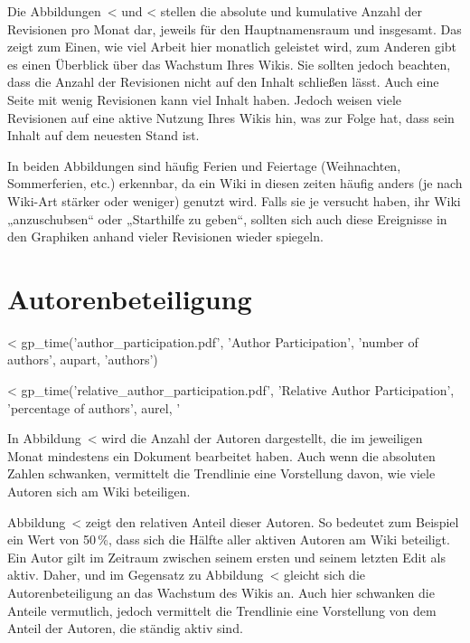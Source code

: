 \documentclass{scrartcl}
\begin{document}
Die Abbildungen~<%
und 
<%
stellen die absolute und kumulative Anzahl der Revisionen pro Monat dar, jeweils für den Hauptnamensraum und insgesamt. Das zeigt zum Einen, wie viel Arbeit hier monatlich geleistet wird, zum Anderen gibt es einen Überblick über das Wachstum Ihres Wikis. Sie sollten jedoch beachten, dass die Anzahl der Revisionen nicht auf den Inhalt schließen lässt. Auch eine Seite mit wenig Revisionen kann viel Inhalt haben. Jedoch weisen viele Revisionen auf eine aktive Nutzung Ihres Wikis hin, was zur Folge hat, dass sein Inhalt auf dem neuesten Stand ist. 

In beiden Abbildungen sind häufig Ferien und Feiertage (Weihnachten, Sommerferien, etc.) erkennbar, da ein Wiki in diesen zeiten häufig anders (je nach Wiki-Art stärker oder weniger) genutzt wird. Falls sie je versucht haben, ihr Wiki „anzuschubsen“ oder „Starthilfe zu geben“, sollten sich auch diese Ereignisse in den Graphiken anhand vieler Revisionen wieder spiegeln.


\section{Autorenbeteiligung} %
\label{sec:author_participation}

<%
gp_time('author_participation.pdf', 
        'Author Participation', 'number of authors', 
        aupart, 'authors')

<%
gp_time('relative_author_participation.pdf', 
        'Relative Author Participation', 
        'percentage of authors', 
        aurel, '%

In Abbildung~<%
wird die Anzahl der Autoren dargestellt, die im jeweiligen Monat mindestens ein Dokument bearbeitet haben. Auch wenn die absoluten Zahlen schwanken, vermittelt die Trendlinie eine Vorstellung davon, wie viele Autoren sich am Wiki beteiligen.


Abbildung~<%
zeigt den relativen Anteil dieser Autoren. %
So bedeutet zum Beispiel ein Wert von 50\,\%, dass sich die Hälfte aller aktiven Autoren am Wiki beteiligt. Ein Autor gilt im Zeitraum zwischen seinem ersten und seinem letzten Edit als aktiv. Daher, und im Gegensatz zu Abbildung~<%
gleicht sich die Autorenbeteiligung an das Wachstum des Wikis an. Auch hier schwanken die Anteile vermutlich, jedoch vermittelt die Trendlinie eine Vorstellung von dem Anteil der Autoren, die ständig aktiv sind.
\end{document}
